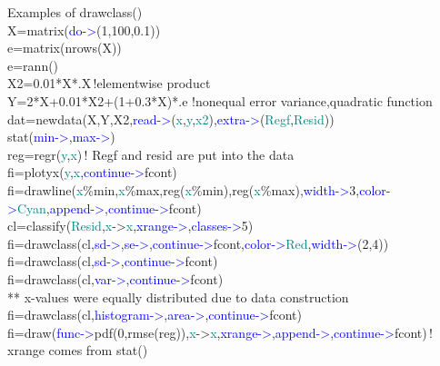 \begin{example}[drawclassex]Examples of \textcolor{VioletRed}{drawclass}()\\ 
\label{drawclassex} 
\noindent X=\textcolor{VioletRed}{matrix}(\textcolor{blue}{do->}(1,100,0.1))\\ 
e=\textcolor{VioletRed}{matrix}(\textcolor{VioletRed}{nrows}(X))\\ 
e=\textcolor{VioletRed}{rann}()\\ 
X2=0.01*X*.X\,{\color{ForestGreen}!elementwise product}\\ 
Y=2*X+0.01*X2+(1+0.3*X)*.e\,\,{\color{ForestGreen}!nonequal error variance,quadratic function}\\ 
dat=\textcolor{VioletRed}{newdata}(X,Y,X2,\textcolor{blue}{read->}(\textcolor{teal}{x},\textcolor{teal}{y},\textcolor{teal}{x2}),\textcolor{blue}{extra->}(\textcolor{teal}{Regf},\textcolor{teal}{Resid}))\\ 
\textcolor{VioletRed}{stat}(\textcolor{blue}{min->},\textcolor{blue}{max->})\\ 
reg=\textcolor{VioletRed}{regr}(\textcolor{teal}{y},\textcolor{teal}{x})\,{\color{ForestGreen}! Regf and resid are put into the data}\\ 
fi=\textcolor{VioletRed}{plotyx}(\textcolor{teal}{y},\textcolor{teal}{x},\textcolor{blue}{continue->}fcont)\\ 
fi=\textcolor{VioletRed}{drawline}(\textcolor{teal}{x}\%min,\textcolor{teal}{x}\%max,reg(\textcolor{teal}{x}\%min),reg(\textcolor{teal}{x}\%max),\textcolor{blue}{width->}3,\textcolor{blue}{color->}\textcolor{teal}{Cyan},\textcolor{blue}{append->},\textcolor{blue}{continue->}fcont)\\ 
cl=\textcolor{VioletRed}{classify}(\textcolor{teal}{Resid},\textcolor{teal}{x}->\textcolor{teal}{x},\textcolor{blue}{xrange->},\textcolor{blue}{classes->}5)\\ 
fi=\textcolor{VioletRed}{drawclass}(cl,\textcolor{blue}{sd->},\textcolor{blue}{se->},\textcolor{blue}{continue->}fcont,\textcolor{blue}{color->}\textcolor{teal}{Red},\textcolor{blue}{width->}(2,4))\\ 
fi=\textcolor{VioletRed}{drawclass}(cl,\textcolor{blue}{sd->},\textcolor{blue}{continue->}fcont)\\ 
fi=\textcolor{VioletRed}{drawclass}(cl,\textcolor{blue}{var->},\textcolor{blue}{continue->}fcont)\\ 
{\color{ForestGreen}** x-values were equally distributed due to data construction}\\ 
fi=\textcolor{VioletRed}{drawclass}(cl,\textcolor{blue}{histogram->},\textcolor{blue}{area->},\textcolor{blue}{continue->}fcont)\\ 
fi=\textcolor{VioletRed}{draw}(\textcolor{blue}{func->}\textcolor{VioletRed}{pdf}(0,\textcolor{VioletRed}{rmse}(reg)),\textcolor{teal}{x}->\textcolor{teal}{x},\textcolor{blue}{xrange->},\textcolor{blue}{append->},\textcolor{blue}{continue->}fcont)\,{\color{ForestGreen}! xrange comes from stat()}\\ 
\end{example} 
